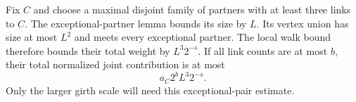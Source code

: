 Fix $C$ and choose a maximal disjoint family of partners with at least three links to $C$.
The exceptional-partner lemma bounds its size by $L$.
Its vertex union has size at most $L^2$ and meets every exceptional partner.
The local walk bound therefore bounds their total weight by $L^3 2^{-s}$.
If all link counts are at most $b$, their total normalized joint contribution is at most
\[
 a_C2^bL^3 2^{-s}.
\]
Only the larger girth scale will need this exceptional-pair estimate.
